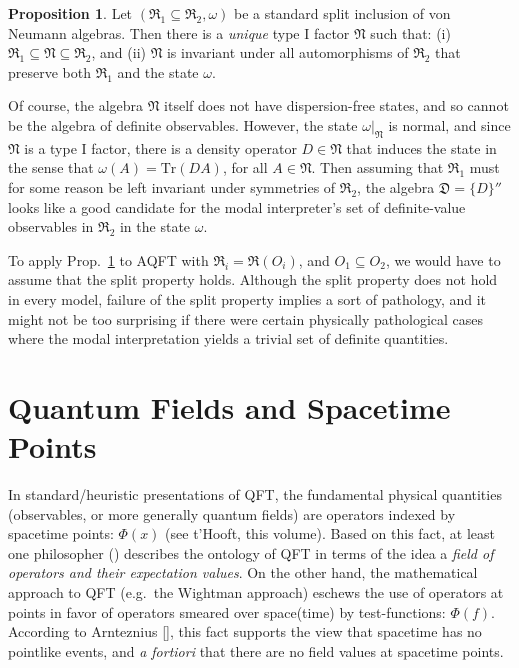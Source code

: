 \documentclass[12pt]{article}
\theoremstyle{definition}
\newtheorem{prop}[thm]{Proposition}
\theoremstyle{definition}
\theoremstyle{remark}
\def\al#1{{\mathfrak #1}}
\def\om{\omega} \def\Om{\Omega} \def\dd{\partial} \def\D{\Delta}
\newcommand{\tr}{\mathrm{Tr}}
\begin{document}
\begin{prop} Let $(\al R_1\subseteq \al R_2 ,\om )$ be
  a standard split inclusion of von Neumann algebras.
  Then there is a \emph{unique} type I factor $\al N$
  such that: (i) $\al R_1\subseteq \al N\subseteq \al
  R_2$, and (ii) $\al N$ is invariant under all
  automorphisms of $\al R_2$ that preserve both $\al
  R_1$ and the state $\om$. \label{midd} \end{prop}

Of course, the algebra $\al N$ itself does not have dispersion-free
states, and so cannot be the algebra of definite observables.
However, the state $\om |_{\al N}$ is normal, and since $\al N$ is a
type I factor, there is a density operator $D\in \al N$ that induces
the state in the sense that $\om (A)=\tr (DA)$, for all $A\in \al N$.
Then assuming that $\al R_1$ must for some reason be left invariant
under symmetries of $\al R_2$, the algebra $\al D =\{ D\}''$ looks
like a good candidate for the modal interpreter's set of
definite-value observables in $\al R_2$ in the state $\om$.

To apply Prop.\ \ref{midd} to AQFT with $\al R_i=\al R(O_i)$, and
$O_1\subseteq O_2$, we would have to assume that the split property
holds.  Although the split property does not hold in every model,
failure of the split property implies a sort of pathology, and it
might not be too surprising if there were certain physically
pathological cases where the modal interpretation yields a trivial set
of definite quantities.



\bigskip {}


\section{Quantum Fields and Spacetime Points} \label{pointy}

In standard/heuristic presentations of QFT, the fundamental physical
quantities (observables, or more generally quantum fields) are
operators indexed by spacetime points: $\Phi (x)$ (see t'Hooft, this
volume).  Based on this fact, at least one philosopher (\cite{tell})
describes the ontology of QFT in terms of the idea a \emph{field of
  operators and their expectation values}.  On the other hand, the
mathematical approach to QFT (e.g.\ the Wightman approach) eschews the
use of operators at points in favor of operators smeared over
space(time) by test-functions: $\Phi (f)$.  According to Arnteznius
[\citeyear{franky}], this fact supports the view that spacetime has no
pointlike events, and \emph{a fortiori} that there are no field values
at spacetime points.
\end{document}
